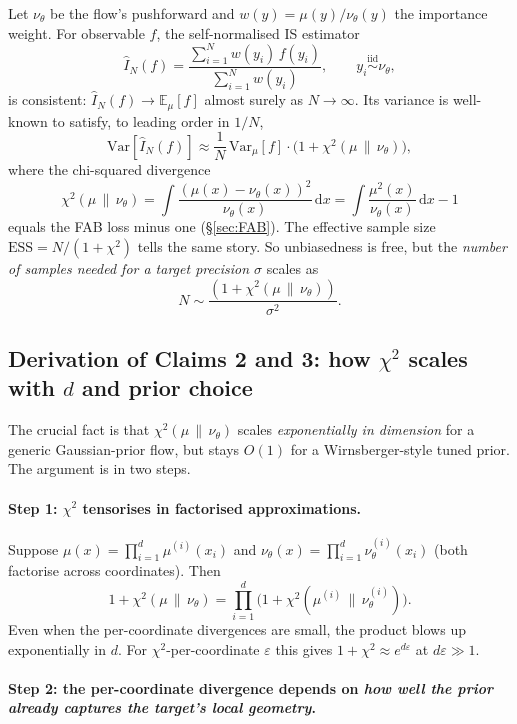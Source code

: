 \documentclass[11pt,letterpaper]{article}
\newcommand{\E}{\mathbb{E}}
\newcommand{\ESS}{\mathrm{ESS}}
\newcommand{\dd}{\mathrm{d}}
\theoremstyle{plain}
\begin{document}
Let $\nu_\theta$ be the flow's pushforward and $w(y) = \mu(y)/\nu_\theta(y)$
the importance weight. For observable $f$, the self-normalised IS estimator
\[
  \widehat I_N(f) = \frac{\sum_{i=1}^N w(y_i)\,f(y_i)}{\sum_{i=1}^N w(y_i)},
  \qquad y_i \overset{\text{iid}}{\sim}\nu_\theta,
\]
is consistent: $\widehat I_N(f)\to \E_\mu[f]$ almost surely as $N\to\infty$. Its
variance is well-known to satisfy, to leading order in $1/N$,
\[
  \mathrm{Var}[\widehat I_N(f)] \approx \frac{1}{N}\,\mathrm{Var}_{\mu}[f]\cdot\big(1 + \chi^2(\mu\,\|\,\nu_\theta)\big),
\]
where the chi-squared divergence
\[
  \chi^2(\mu\,\|\,\nu_\theta) = \int \frac{(\mu(x)-\nu_\theta(x))^2}{\nu_\theta(x)}\,\dd x = \int \frac{\mu^2(x)}{\nu_\theta(x)}\,\dd x - 1
\]
equals the FAB loss minus one (\S\ref{sec:FAB}). The effective sample size
$\ESS = N/(1+\chi^2)$ tells the same story. So unbiasedness is free, but the
\emph{number of samples needed for a target precision $\sigma$} scales as
\[
  N \sim \frac{(1+\chi^2(\mu\,\|\,\nu_\theta))}{\sigma^2}.
\]

\subsection{Derivation of Claims 2 and 3: how $\chi^2$ scales with $d$ and prior choice}

The crucial fact is that $\chi^2(\mu\,\|\,\nu_\theta)$ scales
\emph{exponentially in dimension} for a generic Gaussian-prior flow, but stays
$O(1)$ for a Wirnsberger-style tuned prior. The argument is in two steps.

\paragraph{Step 1: $\chi^2$ tensorises in factorised approximations.}
Suppose $\mu(x) = \prod_{i=1}^d \mu^{(i)}(x_i)$ and $\nu_\theta(x) = \prod_{i=1}^d \nu_\theta^{(i)}(x_i)$
(both factorise across coordinates). Then
\[
  1 + \chi^2(\mu\,\|\,\nu_\theta) = \prod_{i=1}^d \!\big(1 + \chi^2(\mu^{(i)}\,\|\,\nu_\theta^{(i)})\big).
\]
Even when the per-coordinate divergences are small, the product blows up
exponentially in $d$. For $\chi^2$-per-coordinate $\varepsilon$ this gives
$1+\chi^2 \approx e^{d\varepsilon}$ at $d\varepsilon \gg 1$.

\paragraph{Step 2: the per-coordinate divergence depends on \emph{how well the
prior already captures the target's local geometry}.}
\end{document}
